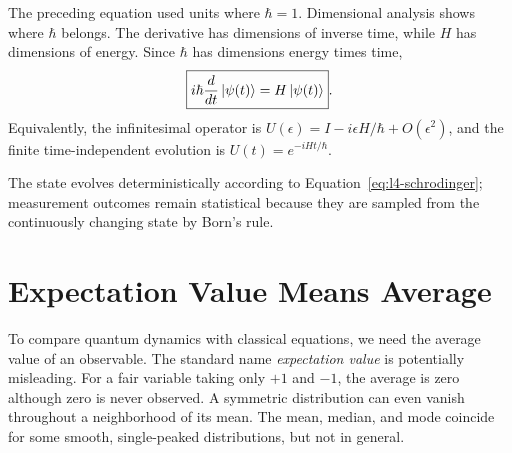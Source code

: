 The preceding equation used units where \(\hbar=1\). Dimensional analysis shows where \(\hbar\) belongs. The derivative has dimensions of inverse time, while \(H\) has dimensions of energy. Since \(\hbar\) has dimensions energy times time,
\begin{equation}
\boxed{i\hbar\frac{d}{dt}\left\lvert\psi(t)\right\rangle=H\left\lvert\psi(t)\right\rangle}.
\label{eq:l4-schrodinger}
\end{equation}
Equivalently, the infinitesimal operator is \(U(\epsilon)=I-i\epsilon H/\hbar+O(\epsilon^2)\), and the finite time-independent evolution is \(U(t)=e^{-iHt/\hbar}\).

\begin{classroomqa}
\end{classroomqa}

The state evolves deterministically according to Equation~\eqref{eq:l4-schrodinger}; measurement outcomes remain statistical because they are sampled from the continuously changing state by Born's rule.

\begin{classroomqa}
\end{classroomqa}

\section{Expectation Value Means Average}

To compare quantum dynamics with classical equations, we need the average value of an observable. The standard name \emph{expectation value} is potentially misleading. For a fair variable taking only \(+1\) and \(-1\), the average is zero although zero is never observed. A symmetric distribution can even vanish throughout a neighborhood of its mean. The mean, median, and mode coincide for some smooth, single-peaked distributions, but not in general.

